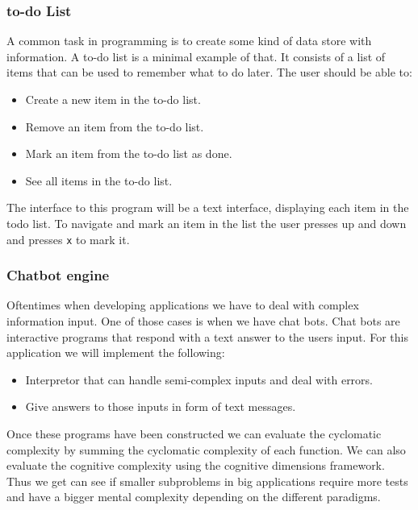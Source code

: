 \documentclass[12pt]{report}
\theoremstyle{definition}
\theoremstyle{theorem}
\begin{document}
\subsubsection*{to-do List}

A common task in programming is to create some kind of data store with
information. A to-do list is a minimal example of that. It consists of a list of
items that can be used to remember what to do later. The user should be able to:

\begin{itemize}
    \item Create a new item in the to-do list.
    \item Remove an item from the to-do list.
    \item Mark an item from the to-do list as done.
    \item See all items in the to-do list.
\end{itemize}

The interface to this program will be a text interface, displaying each item in
the todo list. To navigate and mark an item in the list the user presses up and
down and presses \texttt{x} to mark it.

\subsubsection*{Chatbot engine}

Oftentimes when developing applications we have to deal with complex information
input. One of those cases is when we have chat bots. Chat bots are interactive
programs that respond with a text answer to the users input. For this
application we will implement the following:

\begin{itemize}
    \item Interpretor that can handle semi-complex inputs and deal with errors.
    \item Give answers to those inputs in form of text messages.
\end{itemize}

\noindent Once these programs have been constructed we can evaluate the
cyclomatic complexity by summing the cyclomatic complexity of each function. We
can also evaluate the cognitive complexity using the cognitive dimensions
framework. Thus we get can see if smaller subproblems in big applications
require more tests and have a bigger mental complexity depending on the different
paradigms.
\end{document}
